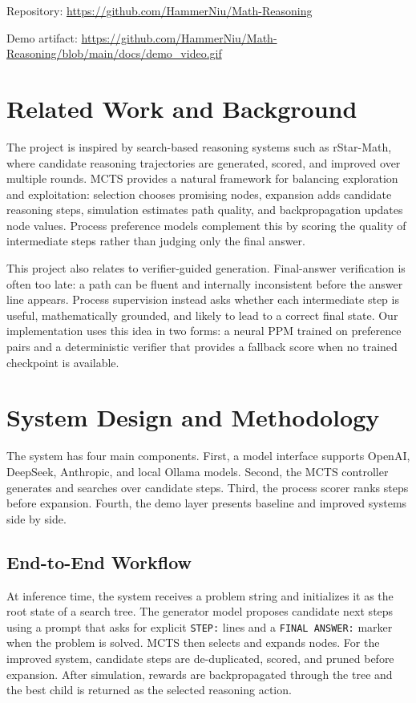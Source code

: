 \documentclass[sigconf,nonacm]{acmart}
\begin{document}
\noindent Repository:
\url{https://github.com/HammerNiu/Math-Reasoning}

\noindent Demo artifact:
\url{https://github.com/HammerNiu/Math-Reasoning/blob/main/docs/demo_video.gif}

\section{Related Work and Background}

The project is inspired by search-based reasoning systems such as rStar-Math,
where candidate reasoning trajectories are generated, scored, and improved over
multiple rounds. MCTS provides a natural framework for balancing exploration and
exploitation: selection chooses promising nodes, expansion adds candidate
reasoning steps, simulation estimates path quality, and backpropagation updates
node values. Process preference models complement this by scoring the quality of
intermediate steps rather than judging only the final answer.

This project also relates to verifier-guided generation. Final-answer
verification is often too late: a path can be fluent and internally
inconsistent before the answer line appears. Process supervision instead asks
whether each intermediate step is useful, mathematically grounded, and likely to
lead to a correct final state. Our implementation uses this idea in two forms:
a neural PPM trained on preference pairs and a deterministic verifier that
provides a fallback score when no trained checkpoint is available.

\section{System Design and Methodology}

The system has four main components. First, a model interface supports OpenAI,
DeepSeek, Anthropic, and local Ollama models. Second, the MCTS controller
generates and searches over candidate steps. Third, the process scorer ranks
steps before expansion. Fourth, the demo layer presents baseline and improved
systems side by side.

\subsection{End-to-End Workflow}

At inference time, the system receives a problem string and initializes it as
the root state of a search tree. The generator model proposes candidate next
steps using a prompt that asks for explicit \texttt{STEP:} lines and a
\texttt{FINAL ANSWER:} marker when the problem is solved. MCTS then selects and
expands nodes. For the improved system, candidate steps are de-duplicated,
scored, and pruned before expansion. After simulation, rewards are
backpropagated through the tree and the best child is returned as the selected
reasoning action.
\end{document}
